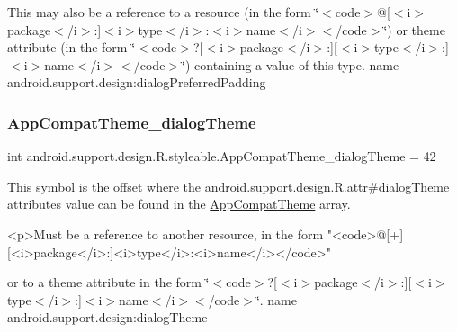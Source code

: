 This may also be a reference to a resource (in the form \char`\"{}$<$code$>$@\mbox{[}$<$i$>$package$<$/i$>$\+:\mbox{]}$<$i$>$type$<$/i$>$\+:$<$i$>$name$<$/i$>$$<$/code$>$\char`\"{}) or theme attribute (in the form \char`\"{}$<$code$>$?\mbox{[}$<$i$>$package$<$/i$>$\+:\mbox{]}\mbox{[}$<$i$>$type$<$/i$>$\+:\mbox{]}$<$i$>$name$<$/i$>$$<$/code$>$\char`\"{}) containing a value of this type.  name android.\+support.\+design\+:dialog\+Preferred\+Padding \mbox{\label{classandroid_1_1support_1_1design_1_1R_1_1styleable_af6160d10b114a6eb6ee2f89975605153}} 
\subsubsection{\texorpdfstring{App\+Compat\+Theme\+\_\+dialog\+Theme}{AppCompatTheme\_dialogTheme}}
{\footnotesize\ttfamily int android.\+support.\+design.\+R.\+styleable.\+App\+Compat\+Theme\+\_\+dialog\+Theme = 42\hspace{0.3cm}{\ttfamily [static]}}

This symbol is the offset where the \hyperlink{classandroid_1_1support_1_1design_1_1R_1_1attr_a9d4fd20161a17ac001044defe33997c6}{android.\+support.\+design.\+R.\+attr\#dialog\+Theme} attribute\textquotesingle{}s value can be found in the \hyperlink{classandroid_1_1support_1_1design_1_1R_1_1styleable_afb351dc8de20cbd4c89abe360373010c}{App\+Compat\+Theme} array.

\begin{DoxyVerb}      <p>Must be a reference to another resource, in the form "<code>@[+][<i>package</i>:]<i>type</i>:<i>name</i></code>"
\end{DoxyVerb}
 or to a theme attribute in the form \char`\"{}$<$code$>$?\mbox{[}$<$i$>$package$<$/i$>$\+:\mbox{]}\mbox{[}$<$i$>$type$<$/i$>$\+:\mbox{]}$<$i$>$name$<$/i$>$$<$/code$>$\char`\"{}.  name android.\+support.\+design\+:dialog\+Theme \mbox{\label{classandroid_1_1support_1_1design_1_1R_1_1styleable_a5366d4aaeb8ade180e8f192c8c58366f}} 

